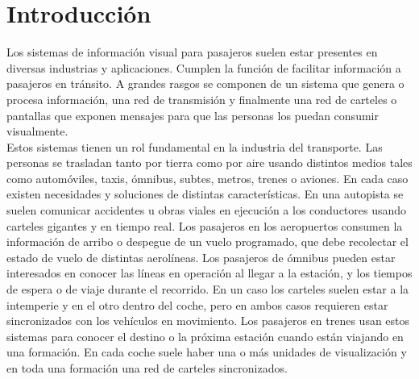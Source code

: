 
\newcommand{\keyword}[1]{\textbf{#1}}
\newcommand{\tabhead}[1]{\textbf{#1}}
\newcommand{\code}[1]{\texttt{#1}}
\newcommand{\file}[1]{\texttt{\bfseries#1}}
\newcommand{\option}[1]{\texttt{\itshape#1}}
\newcommand{\grados}{$^{\circ}$}



\chapter{Introducción} %
\label{Chapter1} %
\label{Intro}

Los sistemas de información visual para pasajeros suelen estar presentes en diversas industrias y aplicaciones. Cumplen la función de facilitar información a pasajeros en tránsito. A grandes rasgos se componen de un sistema que genera o procesa información, una red de transmisión y finalmente una red de carteles o pantallas que exponen mensajes para que las personas los puedan consumir visualmente.\\

 Estos sistemas tienen un rol fundamental en la industria del transporte. Las personas se trasladan tanto por tierra como por aire usando distintos medios tales como automóviles, taxis, ómnibus, subtes, metros, trenes  o aviones. En cada caso existen necesidades y soluciones de distintas características. En una autopista se suelen comunicar accidentes u obras viales en ejecución a los conductores usando carteles gigantes y en tiempo real. Los pasajeros en los aeropuertos consumen la información de arribo o despegue de un vuelo programado, que debe recolectar el estado de vuelo de distintas aerolíneas. Los pasajeros de ómnibus pueden estar interesados en conocer las líneas en operación al llegar a la estación, y los tiempos de espera o de viaje durante el recorrido. En un caso los carteles suelen estar a la intemperie y en el otro dentro del coche, pero en ambos casos requieren estar sincronizados con los vehículos en movimiento. Los pasajeros en trenes usan estos sistemas para conocer el destino o la próxima estación cuando están viajando en una formación. En cada coche suele haber una o más unidades de visualización y en toda una formación una red de carteles sincronizados. \\

